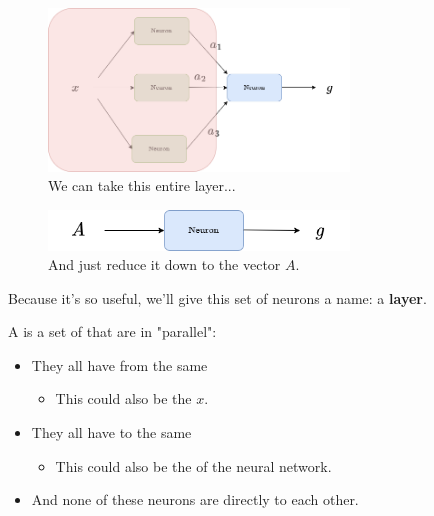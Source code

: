         \begin{figure}[H]
            \centering
            \includegraphics[width=80mm,scale=0.4]{images/nn_images/abstracting_A.png}
            \caption*{We can take this entire layer...}
        \end{figure}
        
        \begin{figure}[H]
            \centering
            \includegraphics[width=80mm,scale=0.4]{images/nn_images/second_layer.png}
            \caption*{And just reduce it down to the vector $A$.}
        \end{figure}

        Because it's so useful, we'll give this set of neurons a name: a \textbf{layer}.\\
        
        \begin{definition}
            A  is a set of  that are in "parallel":
            \begin{itemize}
                \item They all have  from the same 
                    \begin{itemize}
                        \item This  could also be the  $x$.
                    \end{itemize}
                
                \item They all have  to the same 
                    \begin{itemize}
                        \item This  could also be the  of the neural network.
                    \end{itemize}
                
                \item And none of these neurons are directly  to each other.
            \end{itemize}
        \end{definition}
        
